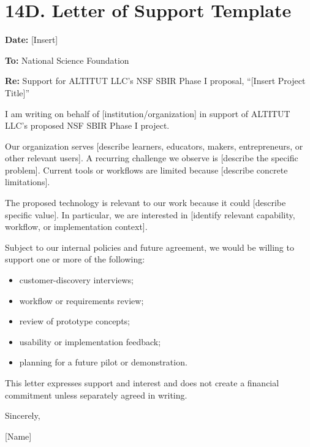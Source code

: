 \documentclass[11pt,letterpaper]{article}
\begin{document}
\section*{14D. Letter of Support Template}

\textbf{Date:} [Insert]

\textbf{To:} National Science Foundation

\textbf{Re:} Support for ALTITUT LLC's NSF SBIR Phase I proposal,
``[Insert Project Title]''

I am writing on behalf of [institution/organization] in support of ALTITUT
LLC's proposed NSF SBIR Phase I project.

Our organization serves [describe learners, educators, makers, entrepreneurs,
or other relevant users]. A recurring challenge we observe is [describe the
specific problem]. Current tools or workflows are limited because [describe
concrete limitations].

The proposed technology is relevant to our work because it could [describe
specific value]. In particular, we are interested in [identify relevant
capability, workflow, or implementation context].

Subject to our internal policies and future agreement, we would be willing to
support one or more of the following:
\begin{itemize}
\item customer-discovery interviews;
\item workflow or requirements review;
\item review of prototype concepts;
\item usability or implementation feedback;
\item planning for a future pilot or demonstration.
\end{itemize}

This letter expresses support and interest and does not create a financial
commitment unless separately agreed in writing.

Sincerely,

[Name] \\
[Title] \\
[Institution / Organization] \\
[Signature]
\end{document}
